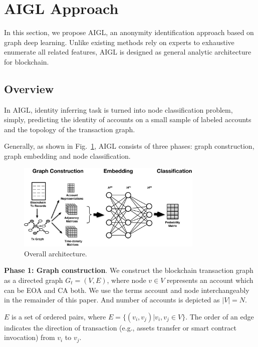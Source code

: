 \section{AIGL Approach}
\label{sec:approach}
In this section, we propose AIGL, an anonymity identification approach based on graph deep learning. Unlike existing methods rely on experts to exhaustive enumerate all related features, AIGL is designed as general analytic architecture for blockchain.


\subsection{Overview}
\label{subsec:methodology}
In AIGL, identity inferring task is turned into node classification problem, simply, predicting the identity of accounts on a small sample of labeled accounts and the topology of the transaction graph.

Generally, as shown in Fig.~\ref{fig:architecture}, AIGL consists of three phases: graph construction, graph embedding and node classification.

\begin{figure}[htbp]
	\centering
	\includegraphics[width=3.5in]{fig/architecture.eps}
	\caption{Overall architecture.}
	\label{fig:architecture}
\end{figure}

\textbf{Phase 1: Graph construction}. We construct the blockchain transaction graph as a directed graph $G_{t}=(V,E)$, where node $v \in V$ represents an account which can be EOA and CA both. We use the terms account and node interchangeably in the remainder of this paper. And number of accounts is depicted as $|V|=N$.

$E$ is a set of ordered pairs, where $E=\{(v_i,v_j)|v_i,v_j \in V\}$. The order of an edge indicates the direction of transaction (e.g., assets transfer or smart contract invocation) from $v_i$ to $v_j$.%

